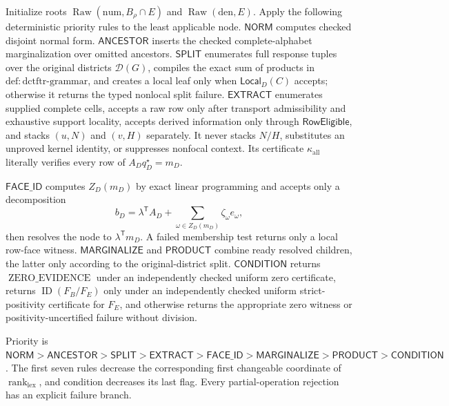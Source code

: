 Initialize roots \(\operatorname{Raw}(\mathrm{num},B_\rho\cap E)\) and \(\operatorname{Raw}(\mathrm{den},E)\).  Apply the following deterministic priority rules to the least applicable node.  \(\mathsf{NORM}\) computes checked disjoint normal form.  \(\mathsf{ANCESTOR}\) inserts the checked complete-alphabet marginalization over omitted ancestors.  \(\mathsf{SPLIT}\) enumerates full response tuples over the original districts \(\mathcal D(G)\), compiles the exact sum of products in \(\mathrm{def:dctftr\text{-}grammar}\), and creates a local leaf only when \(\mathsf{Local}_D(C)\) accepts; otherwise it returns the typed nonlocal split failure.  \(\mathsf{EXTRACT}\) enumerates supplied complete cells, accepts a raw row only after transport admissibility and exhaustive support locality, accepts derived information only through \(\mathsf{RowEligible}\), and stacks \((u,N)\) and \((v,H)\) separately.  It never stacks \(N/H\), substitutes an unproved kernel identity, or suppresses nonfocal context.  Its certificate \(\kappa_{\mathrm{all}}\) literally verifies every row of \(A_Dq_D^\star=m_D\).

\(\mathsf{FACE\_ID}\) computes \(Z_D(m_D)\) by exact linear programming and accepts only a decomposition
\[
b_D=\lambda^{\mathsf T}A_D+
\sum_{\omega\in Z_D(m_D)}\zeta_\omega e_\omega,
\]
then resolves the node to \(\lambda^{\mathsf T}m_D\).  A failed membership test returns only a local row-face witness.  \(\mathsf{MARGINALIZE}\) and \(\mathsf{PRODUCT}\) combine ready resolved children, the latter only according to the original-district split.  \(\mathsf{CONDITION}\) returns \(\operatorname{ZERO\_EVIDENCE}\) under an independently checked uniform zero certificate, returns \(\operatorname{ID}(F_B/F_E)\) only under an independently checked uniform strict-positivity certificate for \(F_E\), and otherwise returns the appropriate zero witness or positivity-uncertified failure without division.

Priority is \(\mathsf{NORM}>\mathsf{ANCESTOR}>\mathsf{SPLIT}>\mathsf{EXTRACT}>\mathsf{FACE\_ID}>\mathsf{MARGINALIZE}>\mathsf{PRODUCT}>\mathsf{CONDITION}\).  The first seven rules decrease the corresponding first changeable coordinate of \(\operatorname{rank}_{\mathrm{lex}}\), and condition decreases its last flag.  Every partial-operation rejection has an explicit failure branch.